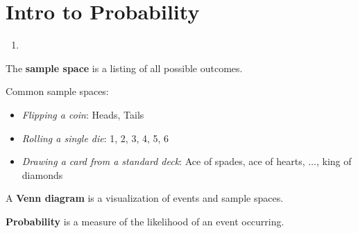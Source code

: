 \documentclass{article}
\begin{document}
\section*{Intro to Probability}

\begin{tcolorbox}[colframe=orange!70!white, coltitle=black, title=\textbf{Summary}]
\begin{enumerate}
    \item 
\end{enumerate}
\end{tcolorbox}
\vspace{0.75in}

\begin{tcolorbox}[colframe=green!20!black, colback = green!30!white,title=\textbf{Sample Space}]
The \textbf{sample space} is a listing of all possible outcomes.
\end{tcolorbox}
\vspace{0.25in} 
Common sample spaces:
\begin{itemize}
	\item{\emph{Flipping a coin}: Heads, Tails}
	\item{\emph{Rolling a single die}: 1, 2, 3, 4, 5, 6}
	\item{\emph{Drawing a card from a standard deck}: Ace of spades, ace of hearts, $\dots$, king of diamonds}
\end{itemize}

\vspace{0.75in}

\begin{tcolorbox}[colframe=green!20!black, colback = green!30!white,title=\textbf{Venn Diagrams}]
A \textbf{Venn diagram} is a visualization of events and sample spaces.
\end{tcolorbox}
\vspace{0.25in}
\begin{center}
\end{center}

\vfill 

\begin{tcolorbox}[colframe=green!20!black, colback = green!30!white,title=\textbf{Probability}]
\textbf{Probability} is a measure of the likelihood of an event occurring.
\end{tcolorbox}
\vspace{0.25in}
\end{document}
